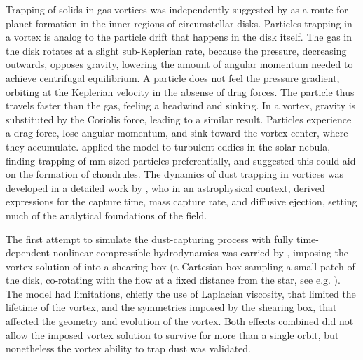 \documentclass[apj]{emulateapj}
\begin{document}

% 

Trapping of solids in gas vortices was independently suggested
by \citep{Barge-Sommeria95,Adams-Watkins95,Tanga96} as a route for
planet formation in the inner regions of circumstellar
disks. Particles trapping in a vortex is analog to the particle drift
that happens in the disk
itself. The gas in the disk rotates at a slight sub-Keplerian rate,
because the pressure, decreasing outwards, opposes gravity,
lowering the amount of angular momentum needed to achieve centrifugal
equilibrium. A particle does not feel the pressure gradient, orbiting at
the Keplerian velocity in the absense of drag forces. The particle
thus travels faster than the gas, feeling a
headwind and sinking. In a vortex, gravity is substituted by the
Coriolis force, leading to a similar result. Particles experience a
drag force, lose angular momentum, and sink toward the vortex
center, where they accumulate. \citet{Klahr-Henning97} applied the model 
to turbulent eddies in the solar nebula, finding trapping of mm-sized
particles preferentially, and suggested this could aid on the
formation of chondrules. The dynamics of dust trapping in vortices was 
developed in a detailed work by \citet{Chavanis00}, who in an astrophysical context, derived expressions for
the capture time, mass capture rate, and diffusive ejection, setting
much of the analytical foundations of the field. 


The first attempt to simulate the dust-capturing process with
fully time-dependent nonlinear compressible hydrodynamics was carried
by \citet{Johansen04}, imposing the vortex solution of
\citet[hereafter GNG]{Goodman87} into a shearing box (a Cartesian box sampling a small
patch of the disk, co-rotating with the flow at a fixed distance from
the star, see e.g. \citealt{Hawley95,Umurhan10}). The model had limitations, chiefly the use of Laplacian
viscosity, that limited the lifetime of the vortex, and the symmetries
imposed by the shearing box, that affected the geometry and evolution
of the vortex.  Both effects combined did not allow the
imposed vortex solution to survive for more than a single orbit, but
nonetheless the vortex ability to trap dust was validated. 
\end{document}

